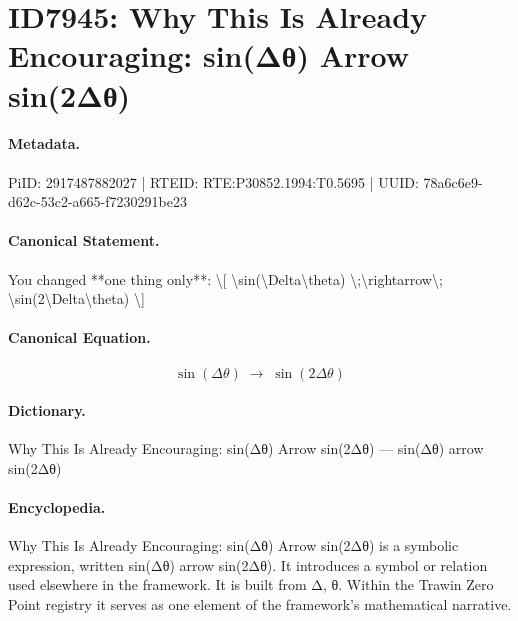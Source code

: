 \section*{ID7945: Why This Is Already Encouraging: sin(Δθ) Arrow sin(2Δθ)}
\paragraph{Metadata.}
PiID: 2917487882027 | RTEID: RTE:P30852.1994:T0.5695 | UUID: 78a6c6e9-d62c-53c2-a665-f7230291be23

\paragraph{Canonical Statement.}
You changed **one thing only**: \textbackslash{}[ \textbackslash{}sin(\textbackslash{}Delta\textbackslash{}theta) \textbackslash{};\textbackslash{}rightarrow\textbackslash{}; \textbackslash{}sin(2\textbackslash{}Delta\textbackslash{}theta) \textbackslash{}]

\paragraph{Canonical Equation.}
\[
\sin(\Delta\theta) \;\rightarrow\; \sin(2\Delta\theta)
\]

\paragraph{Dictionary.}
Why This Is Already Encouraging: sin(Δθ) Arrow sin(2Δθ) — sin(Δθ) arrow sin(2Δθ)

\paragraph{Encyclopedia.}
Why This Is Already Encouraging: sin(Δθ) Arrow sin(2Δθ) is a symbolic expression, written sin(Δθ) arrow sin(2Δθ). It introduces a symbol or relation used elsewhere in the framework. It is built from Δ, θ. Within the Trawin Zero Point registry it serves as one element of the framework's mathematical narrative.
